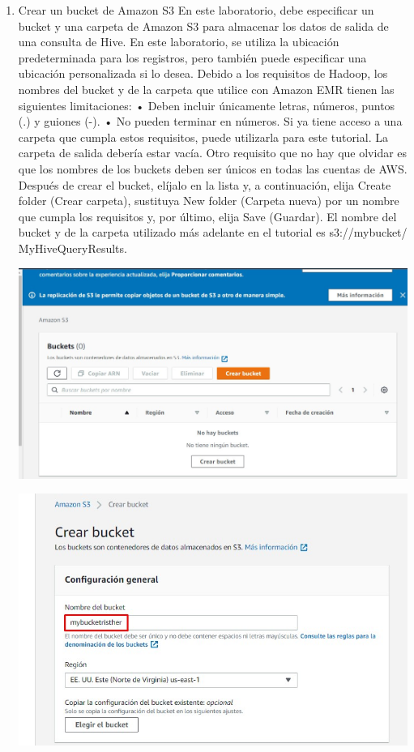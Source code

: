 \documentclass[12pt,letterpaper]{article}
\begin{document}
\begin{enumerate}
		\item Crear un bucket de Amazon S3
		En este laboratorio, debe especificar un bucket y una carpeta de Amazon S3 para almacenar los datos
		de salida de una consulta de Hive. En este laboratorio, se utiliza la ubicación predeterminada para los
		registros, pero también puede especificar una ubicación personalizada si lo desea. Debido a los
		requisitos de Hadoop, los nombres del bucket y de la carpeta que utilice con Amazon EMR tienen las
		siguientes limitaciones:
		• Deben incluir únicamente letras, números, puntos (.) y guiones (-).
		• No pueden terminar en números.
		Si ya tiene acceso a una carpeta que cumpla estos requisitos, puede utilizarla para este tutorial. La
		carpeta de salida debería estar vacía. Otro requisito que no hay que olvidar es que los nombres de los
		buckets deben ser únicos en todas las cuentas de AWS.
		Después de crear el bucket, elíjalo en la lista y, a continuación, elija Create folder (Crear carpeta),
		sustituya New folder (Carpeta nueva) por un nombre que cumpla los requisitos y, por último, elija Save
		(Guardar). El nombre del bucket y de la carpeta utilizado más adelante en el tutorial es s3://mybucket/
		MyHiveQueryResults. 
		\begin{center}
			\includegraphics[width=14cm]{./img/1.2.1.jpg} 
		\end{center}
	\begin{center}
		\includegraphics[width=14cm]{./img/1.2.2.jpg} 

\end{center}
\end{enumerate}
\end{document}
